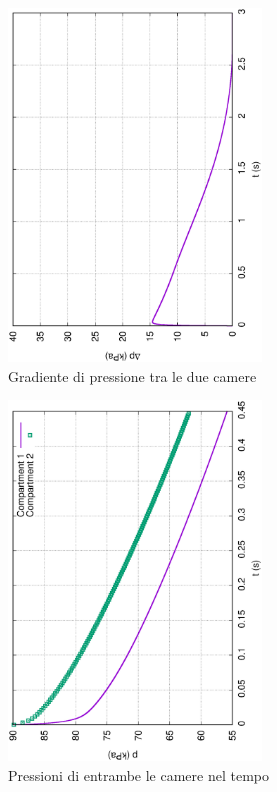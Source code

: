 \documentclass{article}
\begin{document}
        \begin{figure}[h!]
            \centering
            \label{fig:grad_cam_0.5}
            \includegraphics[width=0.6\textwidth, angle=-90]{MUL2/Esercitazione1/1B/Dp.eps}
            \caption{Gradiente di pressione tra le due camere}
        \end{figure}
        \clearpage

        \begin{figure}[h!]
            \centering
            \label{fig:press_cam_1}
            \includegraphics[width=0.6\textwidth, angle=-90]{MUL2/Esercitazione1/1C/p.eps}
            \caption{Pressioni di entrambe le camere nel tempo}
        \end{figure}
\end{document}
